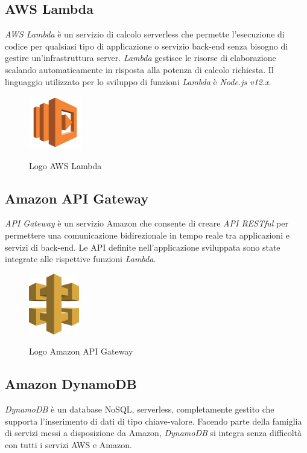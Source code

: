 	\subsection{AWS Lambda}
	\emph{AWS Lambda} è un servizio di calcolo serverless che permette l'esecuzione di codice per qualsiasi tipo di applicazione o servizio back-end senza bisogno di gestire un'infrastruttura server. \emph{Lambda} gestisce le risorse di elaborazione scalando automaticamente in risposta alla potenza di calcolo richiesta. Il linguaggio utilizzato per lo
	sviluppo di funzioni \emph{Lambda} è \emph{Node.js v12.x}.
	
	\begin{figure}[H]
		\centering
		\includegraphics[width=2.3cm]{immagini/aws-lambda.png} \\
		\caption{\label{fig:logo_lambda} Logo AWS Lambda}
	\end{figure}
	
	\subsection{Amazon API Gateway}
	\emph{API Gateway} è un servizio Amazon che consente di creare \emph{API RESTful} per permettere una comunicazione bidirezionale in tempo reale tra applicazioni e servizi di back-end. Le \gls{API} definite nell'applicazione sviluppata sono state
	integrate alle rispettive funzioni \emph{Lambda}.
	
	\begin{figure}[H]
		\centering
		\includegraphics[width=2.2cm]{immagini/api-gateway.png} \\
		\caption{\label{fig:logo_apigateway} Logo Amazon API Gateway}
	\end{figure}
	
	\subsection{Amazon DynamoDB}
	\emph{DynamoDB} è un database \gls{NoSQL}, \gls{serverless}, completamente gestito che supporta l'inserimento di dati di tipo chiave-valore. Facendo parte della famiglia di servizi messi a disposizione da Amazon, \emph{DynamoDB} si integra senza
	difficoltà con tutti i servizi \gls{AWS} e Amazon.
	
